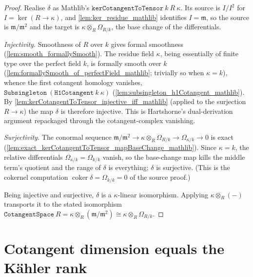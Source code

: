 \begin{proof}
  \leanok
  Realise \(\delta\) as Mathlib's
  \(\texttt{kerCotangentToTensor}\ k\ R\ \kappa\). Its source is
  \(I/I^2\) for \(I = \operatorname{ker}(R \to \kappa)\), and
  \cref{lem:ker_residue_mathlib} identifies \(I = \mathfrak m\), so the source
  is \(\mathfrak m / \mathfrak m^2\) and the target is
  \(\kappa \otimes_R \Omega_{R/k}\), the base change of the differentials.

  \emph{Injectivity.} Smoothness of \(R\) over \(k\) gives formal smoothness
  (\cref{lem:smooth_formallySmooth}). The residue field \(\kappa\), being
  essentially of finite type over the perfect field \(k\), is formally smooth
  over \(k\) (\cref{lem:formallySmooth_of_perfectField_mathlib}; trivially so
  when \(\kappa = k\)), whence the first cotangent homology vanishes,
  \(\texttt{Subsingleton}\ (\texttt{H1Cotangent}\ k\ \kappa)\)
  (\cref{lem:subsingleton_h1Cotangent_mathlib}). By
  \cref{lem:kerCotangentToTensor_injective_iff_mathlib} (applied to the
  surjection \(R \to \kappa\)) the map \(\delta\) is therefore injective. This
  is Hartshorne's dual-derivation argument repackaged through the
  cotangent-complex vanishing.

  \emph{Surjectivity.} The conormal sequence
  \(\mathfrak m/\mathfrak m^2 \to \kappa \otimes_R \Omega_{R/k} \to
  \Omega_{\kappa/k} \to 0\) is exact
  (\cref{lem:exact_kerCotangentToTensor_mapBaseChange_mathlib}). Since
  \(\kappa = k\), the relative differentials \(\Omega_{\kappa/k} =
  \Omega_{k/k}\) vanish, so the base-change map kills the middle term's
  quotient and the range of \(\delta\) is everything; \(\delta\) is
  surjective. (This is the cokernel computation
  \(\operatorname{coker}\delta = \Omega_{k/k} = 0\) of the source proof.)

  Being injective and surjective, \(\delta\) is a \(\kappa\)-linear
  isomorphism. Applying \(\kappa \otimes_R (-)\) transports it to the stated
  isomorphism \(\texttt{CotangentSpace}\ R = \kappa \otimes_R
  (\mathfrak m/\mathfrak m^2) \cong \kappa \otimes_R \Omega_{R/k}\).
\end{proof}

\section{Cotangent dimension equals the K\"ahler rank}

